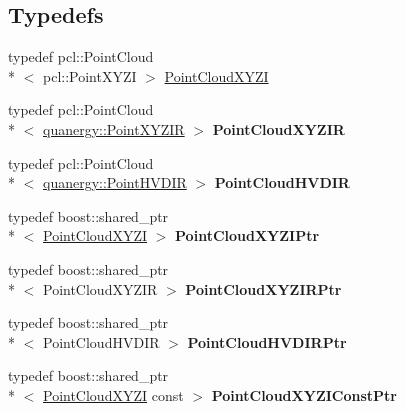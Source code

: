 \subsection*{Typedefs}
\begin{DoxyCompactItemize}
\item 
typedef pcl\-::\-Point\-Cloud\\*
$<$ pcl\-::\-Point\-X\-Y\-Z\-I $>$ \hyperlink{namespacequanergy_ae6c4851788b36d75e7142935c4ed790f}{Point\-Cloud\-X\-Y\-Z\-I}
\item 
\hypertarget{namespacequanergy_ab3d3881789eb468f8a58448b3f1cb022}{typedef pcl\-::\-Point\-Cloud\\*
$<$ \hyperlink{structquanergy_1_1PointXYZIR}{quanergy\-::\-Point\-X\-Y\-Z\-I\-R} $>$ {\bfseries Point\-Cloud\-X\-Y\-Z\-I\-R}}\label{namespacequanergy_ab3d3881789eb468f8a58448b3f1cb022}

\item 
\hypertarget{namespacequanergy_a001f4c8e3333580033fecdf4d16d7064}{typedef pcl\-::\-Point\-Cloud\\*
$<$ \hyperlink{structquanergy_1_1PointHVDIR}{quanergy\-::\-Point\-H\-V\-D\-I\-R} $>$ {\bfseries Point\-Cloud\-H\-V\-D\-I\-R}}\label{namespacequanergy_a001f4c8e3333580033fecdf4d16d7064}

\item 
\hypertarget{namespacequanergy_a46d5ee5979eec6b622d1a707702b11ce}{typedef boost\-::shared\-\_\-ptr\\*
$<$ \hyperlink{namespacequanergy_ae6c4851788b36d75e7142935c4ed790f}{Point\-Cloud\-X\-Y\-Z\-I} $>$ {\bfseries Point\-Cloud\-X\-Y\-Z\-I\-Ptr}}\label{namespacequanergy_a46d5ee5979eec6b622d1a707702b11ce}

\item 
\hypertarget{namespacequanergy_a0ac0c9494d01eb6f4bb12c7ab02eab4f}{typedef boost\-::shared\-\_\-ptr\\*
$<$ Point\-Cloud\-X\-Y\-Z\-I\-R $>$ {\bfseries Point\-Cloud\-X\-Y\-Z\-I\-R\-Ptr}}\label{namespacequanergy_a0ac0c9494d01eb6f4bb12c7ab02eab4f}

\item 
\hypertarget{namespacequanergy_afbb6a445a0ec4ec550e4a1551d90bcc4}{typedef boost\-::shared\-\_\-ptr\\*
$<$ Point\-Cloud\-H\-V\-D\-I\-R $>$ {\bfseries Point\-Cloud\-H\-V\-D\-I\-R\-Ptr}}\label{namespacequanergy_afbb6a445a0ec4ec550e4a1551d90bcc4}

\item 
\hypertarget{namespacequanergy_a55d0a07a102df4ea72bfbe03ca9c7947}{typedef boost\-::shared\-\_\-ptr\\*
$<$ \hyperlink{namespacequanergy_ae6c4851788b36d75e7142935c4ed790f}{Point\-Cloud\-X\-Y\-Z\-I} const  $>$ {\bfseries Point\-Cloud\-X\-Y\-Z\-I\-Const\-Ptr}}\label{namespacequanergy_a55d0a07a102df4ea72bfbe03ca9c7947}


\end{DoxyCompactItemize}
